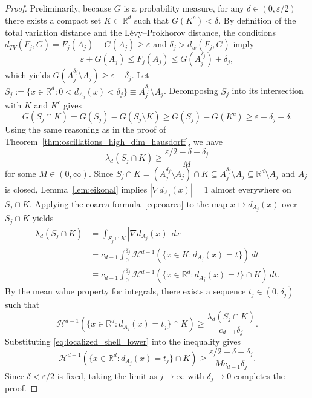 \documentclass[12pt]{article}
\newcommand{\RR}{\mathbb{R}}
\begin{document}
\begin{proof}
Preliminarily, because $G$ is a probability measure, for any $\delta \in (0, \varepsilon/2)$ there exists a compact set $K \subset \RR^d$
such that $G(K^c) < \delta$. By definition of the
total variation distance and the L\'evy--Prokhorov distance, the conditions
$d_{TV}(F_j, G) = F_j(A_j) - G(A_j) \geq \varepsilon$ and $\delta_j > d_w(F_j, G)$ imply
\begin{equation*}
\varepsilon + G(A_j) \leq F_j(A_j) \leq G(A_j^{\delta_j}) + \delta_j,
\end{equation*}
which yields
$G(A_j^{\delta_j} \setminus A_j) \geq \varepsilon - \delta_j$.
Let $S_j :=\{x \in \RR^d : 0 < d_{A_j}(x) < \delta_j\} \equiv A_j^{\delta_j} \setminus A_j$.
Decomposing $S_j$ into its intersection with $K$ and $K^c$ gives
\begin{equation*}
G(S_j \cap K) = G(S_j) - G(S_j \setminus K) \geq G(S_j) - G(K^c) \geq \varepsilon - \delta_j - \delta.
\end{equation*}
Using the same reasoning as in the proof of Theorem~\ref{thm:oscillations_high_dim_hausdorff}, we
have
\begin{equation}\label{eq:localized_shell_lower}
\lambda_d(S_j \cap K) \geq \frac{\varepsilon/2 - \delta - \delta_j}{M}
\end{equation}
%
for some $M\in(0,\infty)$. Since
$S_j \cap K=(A_j^{\delta_j}\setminus A_j)\cap K\subseteq A_j^{\delta_j}\setminus A_j \subseteq \RR^d \setminus A_j$
and $A_j$ is closed, Lemma~\ref{lem:eikonal} implies $|\nabla d_{A_j}(x)| = 1$ almost everywhere
on $S_j \cap K$. Applying the coarea formula~\eqref{eq:coarea} to the map
$x \mapsto d_{A_j}(x)$ over $S_j \cap K$ yields
\begin{align*}
\lambda_d(S_j \cap K) & = \int_{S_j \cap K} |\nabla d_{A_j}(x)| \, dx \\
& = c_{d-1}\int_0^{\delta_j} \mathcal{H}^{d-1}(\{x \in K : d_{A_j}(x) = t\}) \, dt \\
& \equiv c_{d-1}\int_0^{\delta_j} \mathcal{H}^{d-1}(\{x \in \RR^d : d_{A_j}(x) = t\} \cap K) \, dt.
\end{align*}
By the mean value property for integrals, there exists a sequence
$t_j \in (0, \delta_j)$ such that
\begin{equation*}
\mathcal{H}^{d-1}(\{x \in \RR^d : d_{A_j}(x) = t_j\} \cap K) \geq \frac{\lambda_d(S_j \cap K)}{c_{d-1}\delta_j}.
\end{equation*}
Substituting \eqref{eq:localized_shell_lower} into the inequality gives
\begin{equation*}
\mathcal{H}^{d-1}(\{x \in \RR^d : d_{A_j}(x) = t_j\} \cap K) \geq \frac{\varepsilon/2 - \delta - \delta_j}{M c_{d-1}\delta_j}.
\end{equation*}
Since $\delta < \varepsilon/2$ is fixed, taking the limit as $j \to \infty$ with $\delta_j \to 0$
completes the proof.
\end{proof}
\end{document}
